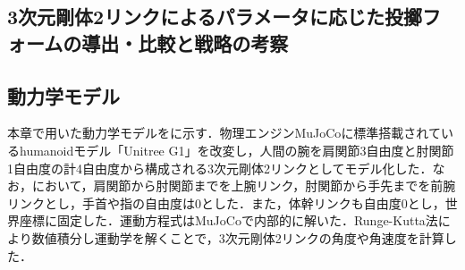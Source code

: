 \begin{small}
\section{3次元剛体2リンクによるパラメータに応じた投擲フォームの導出・比較と戦略の考察}
\subsection{動力学モデル}
本章で用いた動力学モデルをに示す．物理エンジンMuJoCo\cite{mujoco}に標準搭載されているhumanoidモデル「Unitree G1」\cite{unitreeg1}を改変し，人間の腕を肩関節3自由度と肘関節1自由度の計4自由度から構成される3次元剛体2リンクとしてモデル化した．なお，において，肩関節から肘関節までを上腕リンク，肘関節から手先までを前腕リンクとし，手首や指の自由度は0とした．また，体幹リンクも自由度0とし，世界座標に固定した．運動方程式はMuJoCoで内部的に解いた．Runge-Kutta法により数値積分し運動学を解くことで，3次元剛体2リンクの角度や角速度を計算した．

\end{small}
